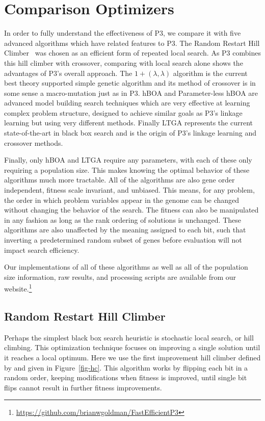 \chapter{Comparison Optimizers}
\label{chap-optimizers}

In order to fully understand the effectiveness of P3, we compare it with five advanced algorithms which
have related features to P3. The Random Restart Hill Climber~\citep{goldman:2014:p3} was chosen as an efficient form of repeated
local search. As P3 combines this hill climber with crossover,
comparing with local search alone shows the advantages of P3's overall approach.
The $1+(\lambda, \lambda)$ algorithm is the current best theory supported simple genetic algorithm
and its method of crossover is in some sense a macro-mutation just as in P3. hBOA and Parameter-less
hBOA are advanced model building search techniques which are very effective at learning complex
problem structure, designed to achieve similar goals as P3's linkage learning but using very different
methods. Finally LTGA represents the current state-of-the-art in black box search and is the origin
of P3's linkage learning and crossover methods.

Finally, only hBOA and LTGA require any parameters, with each of these only requiring a population
size. This makes knowing the optimal behavior of these algorithms much more tractable. All of the
algorithms are also gene order independent, fitness scale invariant, and unbiased. This means,
for any problem, the order in which problem variables appear in the genome can be changed
without changing the behavior of the search. The fitness can also be manipulated in any fashion
as long as the rank ordering of solutions is unchanged. These algorithms are also unaffected by the meaning
assigned to each bit, such that inverting a predetermined random subset of genes before evaluation
will not impact search efficiency.

Our implementations of all of these algorithms as well as all of the population size information, raw results,
and processing scripts
are available from our website.\footnote{\url{https://github.com/brianwgoldman/FastEfficientP3}}

\section{Random Restart Hill Climber}
\label{sec-hill-climber}
Perhaps the simplest black box search heuristic is stochastic local search, or hill climbing.
This optimization technique focuses on improving a single solution until it reaches a local
optimum. Here we use the first improvement hill climber defined by \cite{goldman:2014:p3}
and given in Figure~\ref{fig-hc}. This algorithm works by flipping each bit in a random
order, keeping modifications when fitness is improved, until single bit flips cannot result in
further fitness improvements.

